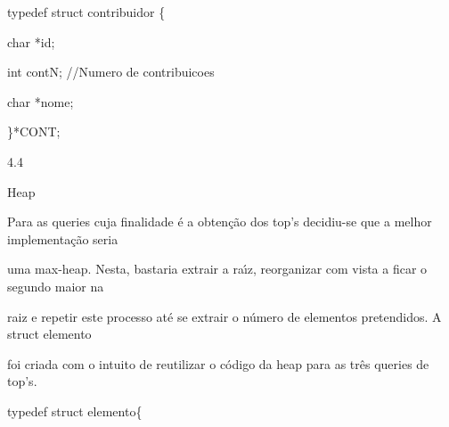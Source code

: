\documentclass[a4paper,portrait,12pt]{article}
\begin{document}
\begin{flushleft}
typedef struct contribuidor \{
\end{flushleft}


\begin{flushleft}
char *id;
\end{flushleft}


\begin{flushleft}
int contN; //Numero de contribuicoes
\end{flushleft}


\begin{flushleft}
char *nome;
\end{flushleft}


\begin{flushleft}
\}*CONT;
\end{flushleft}





4.4





\begin{flushleft}
Heap
\end{flushleft}





\begin{flushleft}
Para as queries cuja finalidade é a obtenção dos top's decidiu-se que a melhor implementação seria
\end{flushleft}


\begin{flushleft}
uma max-heap. Nesta, bastaria extrair a ra\i{}́z, reorganizar com vista a ficar o segundo maior na
\end{flushleft}


\begin{flushleft}
raiz e repetir este processo até se extrair o número de elementos pretendidos. A struct elemento
\end{flushleft}


\begin{flushleft}
foi criada com o intuito de reutilizar o código da heap para as três queries de top's.
\end{flushleft}





\begin{flushleft}
typedef struct elemento\{
\end{flushleft}
\end{document}

